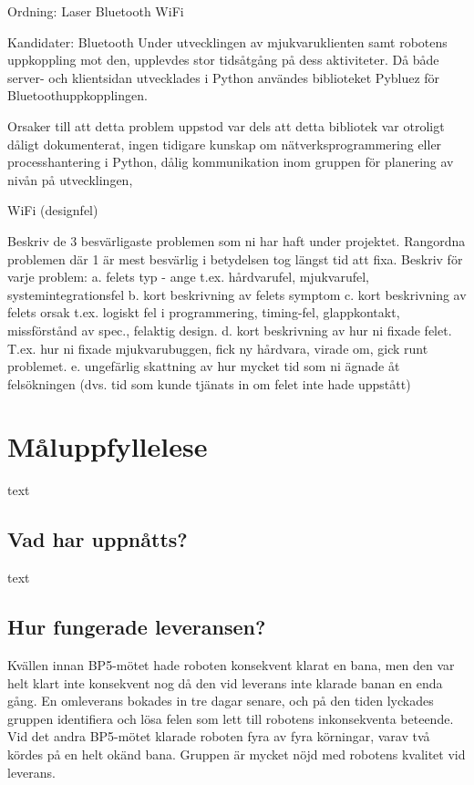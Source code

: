 ﻿\documentclass{article}
\begin{document}
Ordning:
Laser
Bluetooth
WiFi

Kandidater:
Bluetooth
Under utvecklingen av mjukvaruklienten samt robotens uppkoppling mot den, upplevdes stor tidsåtgång på dess aktiviteter. Då både server- och klientsidan utvecklades i Python användes biblioteket Pybluez för Bluetoothuppkopplingen. 

Orsaker till att detta problem uppstod var dels att detta bibliotek var otroligt dåligt dokumenterat, ingen tidigare kunskap om nätverksprogrammering eller processhantering i Python, dålig kommunikation inom gruppen för planering av nivån på utvecklingen, 

WiFi (designfel)


Beskriv de 3 besvärligaste problemen som ni har haft under projektet. 
Rangordna problemen där 1 är mest besvärlig i betydelsen tog längst tid att fixa.
Beskriv för varje problem:
a. felets typ - ange t.ex.  hårdvarufel, mjukvarufel, systemintegrationsfel 
b. kort beskrivning av felets symptom 
c. kort beskrivning av felets orsak t.ex. logiskt fel i programmering, timing-fel, glappkontakt, missförstånd av spec., felaktig design. 
d. kort beskrivning av hur ni fixade felet. T.ex. hur ni fixade mjukvarubuggen, fick ny hårdvara, virade om, gick runt problemet.
e. ungefärlig skattning av hur mycket tid som ni ägnade åt felsökningen (dvs. tid som kunde tjänats in om felet inte hade uppstått)


\clearpage
\section{Måluppfyllelese}
text

\subsection{Vad har uppnåtts?}
text

\subsection{Hur fungerade leveransen?}
Kvällen innan BP5-mötet hade roboten konsekvent klarat en bana, men den var helt klart inte konsekvent nog då den vid leverans inte klarade banan en enda gång. En omleverans bokades in tre dagar senare, och på den tiden lyckades gruppen identifiera och lösa felen som lett till robotens inkonsekventa beteende. Vid det andra BP5-mötet klarade roboten fyra av fyra körningar, varav två kördes på en helt okänd bana. Gruppen är mycket nöjd med robotens kvalitet vid leverans.
\end{document}

